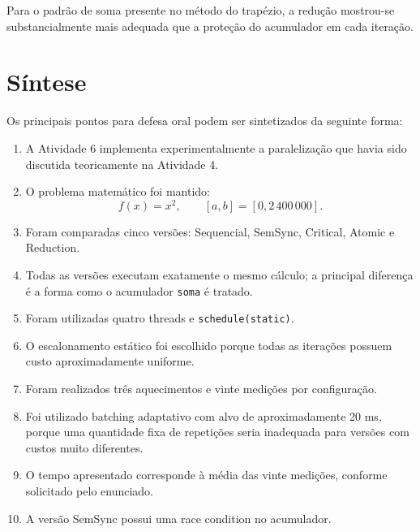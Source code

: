Para o padrão de soma presente no método do trapézio, a redução mostrou-se
substancialmente mais adequada que a proteção do acumulador em cada
iteração.


\section{Síntese}

\label{sec:atvd06-defesa}

Os principais pontos para defesa oral podem ser sintetizados da seguinte
forma:

\begin{enumerate}

    \item A Atividade 6 implementa experimentalmente a paralelização que havia
    sido discutida teoricamente na Atividade 4.

    \item O problema matemático foi mantido:
    \[
        f(x)=x^2,
        \qquad
        [a,b]=[0,2\,400\,000].
    \]

    \item Foram comparadas cinco versões:
    Sequencial, SemSync, Critical, Atomic e Reduction.

    \item Todas as versões executam exatamente o mesmo cálculo; a principal
    diferença é a forma como o acumulador \texttt{soma} é tratado.

    \item Foram utilizadas quatro threads e
    \texttt{schedule(static)}.

    \item O escalonamento estático foi escolhido porque todas as iterações
    possuem custo aproximadamente uniforme.

    \item Foram realizados três aquecimentos e vinte medições por
    configuração.

    \item Foi utilizado batching adaptativo com alvo de aproximadamente
    20 ms, porque uma quantidade fixa de repetições seria inadequada para
    versões com custos muito diferentes.

    \item O tempo apresentado corresponde à média das vinte medições,
    conforme solicitado pelo enunciado.

    \item A versão SemSync possui uma race condition no acumulador.


\end{enumerate}
